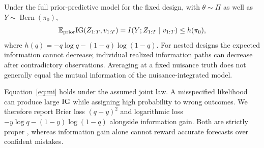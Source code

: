 Under the full prior-predictive model for the fixed design, with $\theta\sim\Pi$ as well as $Y\sim\operatorname{Bern}(\pi_0)$,
\begin{equation}
 \mathbb E_{\mathrm{prior}}\mathrm{IG}(Z_{1:T},v_{1:T})
 = I(Y;Z_{1:T}\mid v_{1:T})\leq h(\pi_0),
 \label{eq:mi}
\end{equation}
where $h(q)=-q\log q-(1-q)\log(1-q)$. For nested designs the expected information cannot decrease; individual realized information paths can decrease after contradictory observations. Averaging at a fixed nuisance truth does not generally equal the mutual information of the nuisance-integrated model.

Equation~\eqref{eq:mi} holds under the assumed joint law. A misspecified likelihood can produce large $\mathrm{IG}$ while assigning high probability to wrong outcomes. We therefore report Brier loss $(q-y)^2$ and logarithmic loss $-y\log q-(1-y)\log(1-q)$ alongside information gain. Both are strictly proper \cite{gneiting2007strictly}, whereas information gain alone cannot reward accurate forecasts over confident mistakes.


